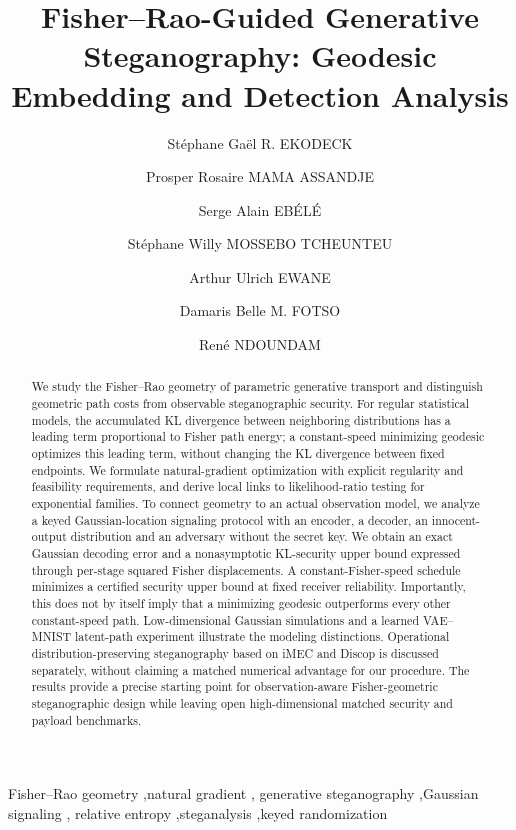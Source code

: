 \documentclass[preprint,12pt]{elsarticle}
\begin{document}
\begin{frontmatter}
\title{Fisher--Rao-Guided Generative Steganography:
Geodesic Embedding and Detection Analysis}
\author[uy1]{St\'ephane Ga\"el R. EKODECK}
\author[uy1]{Prosper Rosaire MAMA ASSANDJE}
\author[uy1]{Serge Alain EB\'EL\'E}
\author[uy1]{St\'ephane Willy MOSSEBO TCHEUNTEU}
\author[uy1]{Arthur Ulrich EWANE}
\author[uy1]{Damaris Belle M. FOTSO}
\author[uy1]{Ren\'e NDOUNDAM}
\begin{abstract}
We study the Fisher--Rao geometry of parametric generative
transport and distinguish geometric path costs from observable
steganographic security. For regular statistical models,
the accumulated KL divergence between neighboring distributions
has a leading term proportional to Fisher path energy; a
constant-speed minimizing geodesic optimizes this leading term,
without changing the KL divergence between fixed endpoints.
We formulate natural-gradient optimization with explicit
regularity and feasibility requirements, and derive local
links to likelihood-ratio testing for exponential families.
To connect geometry to an actual observation model, we analyze a
keyed Gaussian-location signaling protocol with an encoder,
a decoder, an innocent-output distribution and an adversary
without the secret key. We obtain an exact Gaussian decoding
error and a nonasymptotic KL-security upper bound expressed
through per-stage squared Fisher displacements.
A constant-Fisher-speed schedule minimizes a certified
security upper bound at fixed receiver reliability.
Importantly, this does not by itself imply that a minimizing
geodesic outperforms every other constant-speed path.
Low-dimensional Gaussian simulations and a learned
VAE--MNIST latent-path experiment illustrate the modeling
distinctions. Operational distribution-preserving steganography
based on iMEC and Discop is discussed separately, without claiming
a matched numerical advantage for our procedure. The results
provide a precise starting point for observation-aware
Fisher-geometric steganographic design while leaving open
high-dimensional matched security and payload benchmarks.
\end{abstract}
\begin{keyword}
Fisher--Rao geometry \sep natural gradient \sep
generative steganography \sep Gaussian signaling \sep
relative entropy \sep steganalysis \sep keyed randomization
\end{keyword}
\end{frontmatter}
\end{document}
